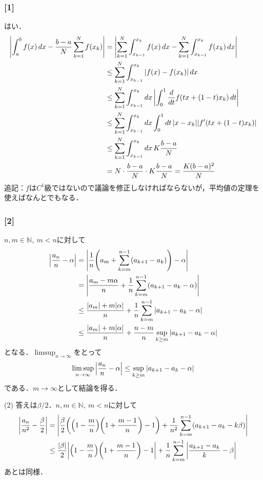 \documentclass[a4j]{ltjsarticle}
\newcommand{\Nset}{\mathbb{N}}
\newcommand{\1}{\mathbbm{1}}
\numberwithin{equation}{section}
\theoremstyle{definition}
\begin{document}
\subsubsection*{[1]}
はい．
\begin{align}
    \abs{\int_{a}^{b}f(x)\,dx-\frac{b-a}{N}\sum_{k=1}^N f(x_k)}
    &=\abs{\sum_{k=1}^N \int_{x_{k-1}}^{x_k}f(x)\,dx-\sum_{k=1}^N \int_{x_{k-1}}^{x_k} f(x_k)\,dx}\\
    &\leq \sum_{k=1}^N \int_{x_{k-1}}^{x_k}\abs{f(x)-f(x_k)}\,dx\\
    &\leq \sum_{k=1}^N \int_{x_{k-1}}^{x_k}dx\,\abs{\int_{0}^{1}\frac{d}{dt}f(tx+(1-t)x_k)\,dt}\\
    &\leq \sum_{k=1}^N \int_{x_{k-1}}^{x_k}dx\int_{0}^{1}dt\,\abs{x-x_k}\abs{f'(tx+(1-t)x_k)}\\
    &\leq \sum_{k=1}^N \int_{x_{k-1}}^{x_k}dx\,K\frac{b-a}{N}\\
    &=N\cdot\frac{b-a}{N}\cdot K\frac{b-a}{N}=\frac{K(b-a)^2}{N}
\end{align}
追記：$f$は$C^1$級ではないので議論を修正しなければならないが，平均値の定理を使えばなんとでもなる．
\subsubsection*{[2]}
$n,m\in\Nset,\ m<n$に対して
\begin{align}
    \abs{\frac{a_n}{n}-\alpha}
    &= \abs{\frac{1}{n}\qty(a_m+\sum_{k=m}^{n-1}(a_{k+1}-a_k))-\alpha}\\
    &=\abs{\frac{a_m-m\alpha}{n}+\frac{1}{n}\sum_{k=m}^{n-1}(a_{k+1}-a_k-\alpha)}\\
    &\leq \frac{\abs{a_m}+m\abs{\alpha}}{n}+\frac{1}{n}\sum_{k=m}^{n-1}\abs{a_{k+1}-a_k-\alpha}\\
    &\leq \frac{\abs{a_m}+m\abs{\alpha}}{n}+\frac{n-m}{n}\sup_{k\geq m}\abs{a_{k+1}-a_k-\alpha}
\end{align}
となる．$\limsup_{n\to\infty}$をとって
\begin{equation}
    \limsup_{n\to\infty}\abs{\frac{a_n}{n}-\alpha}\leq \sup_{k\geq m}\abs{a_{k+1}-a_k-\alpha}
\end{equation}
である．$m\to\infty$として結論を得る．

(2) 答えは$\beta/2$．$n,m\in\Nset,\ m<n$に対して
\begin{align}
    \abs{\frac{a_n}{n^2}-\frac{\beta}{2}}
    &=\abs{\frac{\beta}{2}\qty(\qty(1-\frac{m}{n})\qty(1+\frac{m-1}{n})-1)+\frac{1}{n^2}\sum_{k=m}^{n-1}(a_{k+1}-a_{k}-k\beta)}\\
    &\leq \frac{\abs{\beta}}{2}\abs{\qty(1-\frac{m}{n})\qty(1+\frac{m-1}{n})-1}+\frac{1}{n}\sum_{k=m}^{n-1}\abs{\frac{a_{k+1}-a_{k}}{k}-\beta} 
\end{align}
あとは同様．
\end{document}
